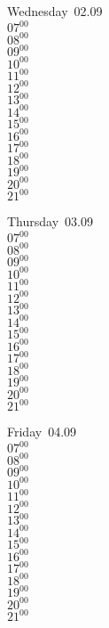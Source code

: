 \documentclass[11pt,a4paper]{book}\usepackage[]{graphicx}\usepackage[]{color}
\begin{document}
\begin{weekdaybox}
  Wednesday~02.09\\
  { 
  \vfill
  $07^{00}$\\
$08^{00}$\\
$09^{00}$\\
$10^{00}$\\
$11^{00}$\\
$12^{00}$\\
$13^{00}$\\
$14^{00}$\\
$15^{00}$\\
$16^{00}$\\
$17^{00}$\\
$18^{00}$\\
$19^{00}$\\
$20^{00}$\\
$21^{00}$\\
  }
\end{weekdaybox}
\clearpage
\begin{headerbox}
\end{headerbox}
\begin{weekdaybox}
  Thursday~03.09\\
  { 
  \vfill
  $07^{00}$\\
$08^{00}$\\
$09^{00}$\\
$10^{00}$\\
$11^{00}$\\
$12^{00}$\\
$13^{00}$\\
$14^{00}$\\
$15^{00}$\\
$16^{00}$\\
$17^{00}$\\
$18^{00}$\\
$19^{00}$\\
$20^{00}$\\
$21^{00}$\\
  }
\end{weekdaybox} 
\begin{weekdaybox}
  Friday~04.09\\
  { 
  \vfill
  $07^{00}$\\
$08^{00}$\\
$09^{00}$\\
$10^{00}$\\
$11^{00}$\\
$12^{00}$\\
$13^{00}$\\
$14^{00}$\\
$15^{00}$\\
$16^{00}$\\
$17^{00}$\\
$18^{00}$\\
$19^{00}$\\
$20^{00}$\\
$21^{00}$\\
  }
\end{weekdaybox}
\end{document}
